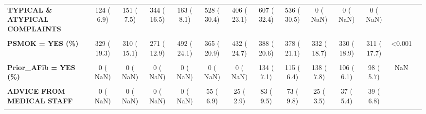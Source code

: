 \documentclass[
]{article}
\begin{document}
\begin{table}[H]
\begin{tabular}[t]{>{\raggedright\arraybackslash}p{5em}ccccccccccccc}
\textbf{TYPICAL \& ATYPICAL COMPLAINTS} & 124 (  6.9) & 151 (  7.5) & 344 ( 16.5) & 163 (  8.1) & 528 ( 30.4) & 406 ( 23.1) & 607 ( 32.4) & 536 ( 30.5) & 0 (  NaN) & 0 (  NaN) & 0 (  NaN) &  & \\
\textbf{\cellcolor{gray!10}{TYPICAL CHEST PAIN}} & \cellcolor{gray!10}{1359 ( 76.0)} & \cellcolor{gray!10}{1583 ( 78.3)} & \cellcolor{gray!10}{794 ( 38.1)} & \cellcolor{gray!10}{1023 ( 51.0)} & \cellcolor{gray!10}{973 ( 56.0)} & \cellcolor{gray!10}{1112 ( 63.2)} & \cellcolor{gray!10}{1095 ( 58.5)} & \cellcolor{gray!10}{937 ( 53.4)} & \cellcolor{gray!10}{0 (  NaN)} & \cellcolor{gray!10}{0 (  NaN)} & \cellcolor{gray!10}{0 (  NaN)} & \cellcolor{gray!10}{} & \cellcolor{gray!10}{}\\
\textbf{PSMOK = YES (\%)} & 329 ( 19.3) & 310 ( 15.1) & 271 ( 12.9) & 492 ( 24.1) & 365 ( 20.9) & 432 ( 24.7) & 388 ( 20.6) & 378 ( 21.1) & 332 ( 18.7) & 330 ( 18.9) & 311 ( 17.7) & <0.001 & \\
\textbf{\cellcolor{gray!10}{PSPCI = YES (\%)}} & \cellcolor{gray!10}{330 ( 18.7)} & \cellcolor{gray!10}{392 ( 19.1)} & \cellcolor{gray!10}{439 ( 21.0)} & \cellcolor{gray!10}{580 ( 28.0)} & \cellcolor{gray!10}{593 ( 34.0)} & \cellcolor{gray!10}{598 ( 33.8)} & \cellcolor{gray!10}{643 ( 34.2)} & \cellcolor{gray!10}{594 ( 33.4)} & \cellcolor{gray!10}{624 ( 35.2)} & \cellcolor{gray!10}{611 ( 34.9)} & \cellcolor{gray!10}{624 ( 36.1)} & \cellcolor{gray!10}{<0.001} & \cellcolor{gray!10}{}\\
\textbf{Prior\_AFib = YES (\%)} & 0 (  NaN) & 0 (  NaN) & 0 (  NaN) & 0 (  NaN) & 0 (  NaN) & 0 (  NaN) & 134 (  7.1) & 115 (  6.4) & 138 (  7.8) & 106 (  6.1) & 98 (  5.7) & NaN & \\
\textbf{\cellcolor{gray!10}{RAMBU (\%)}} & \cellcolor{gray!10}{} & \cellcolor{gray!10}{} & \cellcolor{gray!10}{} & \cellcolor{gray!10}{} & \cellcolor{gray!10}{} & \cellcolor{gray!10}{} & \cellcolor{gray!10}{} & \cellcolor{gray!10}{} & \cellcolor{gray!10}{} & \cellcolor{gray!10}{} & \cellcolor{gray!10}{} & \cellcolor{gray!10}{NaN} & \cellcolor{gray!10}{}\\
\textbf{ADVICE FROM MEDICAL STAFF} & 0 (  NaN) & 0 (  NaN) & 0 (  NaN) & 0 (  NaN) & 55 (  6.9) & 25 (  2.9) & 83 (  9.5) & 73 (  9.8) & 25 (  3.5) & 37 (  5.4) & 39 (  6.8) &  & \\
\textbf{\cellcolor{gray!10}{AMBULANCE NOT AVAILABLE}} & \cellcolor{gray!10}{0 (  NaN)} & \cellcolor{gray!10}{0 (  NaN)} & \cellcolor{gray!10}{0 (  NaN)} & \cellcolor{gray!10}{0 (  NaN)} & \cellcolor{gray!10}{2 (  0.3)} & \cellcolor{gray!10}{1 (  0.1)} & \cellcolor{gray!10}{0 (  0.0)} & \cellcolor{gray!10}{0 (  0.0)} & \cellcolor{gray!10}{0 (  0.0)} & \cellcolor{gray!10}{1 (  0.1)} & \cellcolor{gray!10}{3 (  0.5)} & \cellcolor{gray!10}{} & \cellcolor{gray!10}{}\\

\end{tabular}
\end{table}
\end{document}

